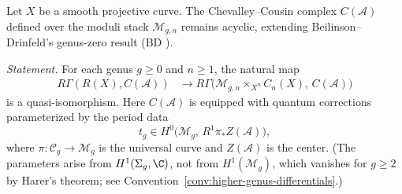 \begin{theorem}\label{thm:CC-acyclicity-higher-genus}
\label{thm:chevalley-cousin}
\label{thm:BD-extension-higher-genus}
Let $X$ be a smooth projective curve. The Chevalley--Cousin complex $C(\mathcal{A})$
defined over the moduli stack $\mathcal{M}_{g,n}$ remains acyclic, extending
Beilinson--Drinfeld's genus-zero result (BD \cite[Theorem 3.4.12]{BD04}).

\emph{Statement.} For each genus $g \geq 0$ and $n \geq 1$, the natural map
\[
\begin{aligned}
R\Gamma(R(X), C(\mathcal{A}))
&\to R\Gamma\bigl(\mathcal{M}_{g,n} \times_{X^n} C_n(X),\, C(\mathcal{A})\bigr)
\end{aligned}
\]
is a quasi-isomorphism. Here $C(\mathcal{A})$ is equipped with quantum
corrections parameterized by the period data
\[
t_g \in H^0\!\bigl(\mathcal{M}_g,\, R^1\pi_* Z(\mathcal{A})\bigr),
\]
where $\pi \colon \mathcal{C}_g \to \mathcal{M}_g$ is the universal curve and $Z(\mathcal{A})$ is the center. (The parameters arise from $H^1(\Sigma_g, \C)$, not from $H^1(\mathcal{M}_g)$, which vanishes for $g \geq 2$ by Harer's theorem; see Convention~\ref{conv:higher-genus-differentials}.)
\end{theorem}

